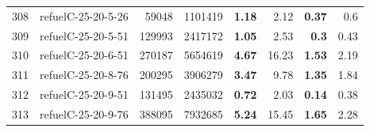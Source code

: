 \begin{longtable}{lrr@{\hskip 12pt}r@{\hskip 12pt}r@{\hskip 12pt}r@{\hskip 12pt}r@{\hskip 12pt}r}
308 & \multirow{1}{*}{refuelC-25-20-5-26} & \multirow{1}{*}{59048} & \multirow{1}{*}{1101419} & \textbf{1.18} & 2.12 & \textbf{0.37} & 0.6 \\
309 & \multirow{1}{*}{refuelC-25-20-5-51} & \multirow{1}{*}{129993} & \multirow{1}{*}{2417172} & \textbf{1.05} & 2.53 & \textbf{0.3} & 0.43 \\
310 & \multirow{1}{*}{refuelC-25-20-6-51} & \multirow{1}{*}{270187} & \multirow{1}{*}{5654619} & \textbf{4.67} & 16.23 & \textbf{1.53} & 2.19 \\
311 & \multirow{1}{*}{refuelC-25-20-8-76} & \multirow{1}{*}{200295} & \multirow{1}{*}{3906279} & \textbf{3.47} & 9.78 & \textbf{1.35} & 1.84 \\
312 & \multirow{1}{*}{refuelC-25-20-9-51} & \multirow{1}{*}{131495} & \multirow{1}{*}{2435032} & \textbf{0.72} & 2.03 & \textbf{0.14} & 0.38 \\
313 & \multirow{1}{*}{refuelC-25-20-9-76} & \multirow{1}{*}{388095} & \multirow{1}{*}{7932685} & \textbf{5.24} & 15.45 & \textbf{1.65} & 2.28 \\
\bottomrule
\end{longtable}